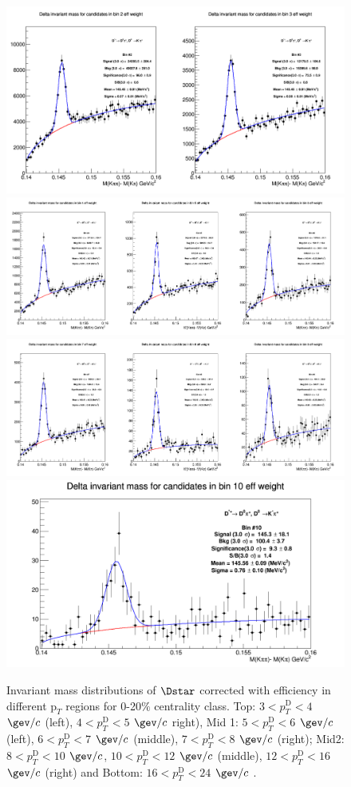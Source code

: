 \begin{figure}[!htp]
\centering
{\includegraphics[width=0.7\linewidth]{figuresVsCent/Dstar/MassPlots/020/InvMassDistributions_Dstar_Bins2to3.png}}
{\includegraphics[width=0.9\linewidth]{figuresVsCent/Dstar/MassPlots/020/InvMassDistributions_Dstar_Bins4to6.png}}
{\includegraphics[width=0.9\linewidth]{figuresVsCent/Dstar/MassPlots/020/InvMassDistributions_Dstar_Bins7to9.png}}
{\includegraphics[width=0.6\linewidth]{figuresVsCent/Dstar/MassPlots/020/InvMassDistributions_Dstar_Bins10to10.png}}
\caption{Invariant mass distributions of $\Dstar$ corrected with efficiency in different $\text{p}_T$ regions for 0-20$\%$ centrality class. Top: $3< p_{T}^{\text{D}}< 4$ $\gev/c$ (left), $4< p_{T}^{\text{D}}< 5$ $\gev/c$ right), Mid 1: $5< p_{T}^{\text{D}}< 6$ $\gev/c$ (left), $6 < p_{T}^{\text{D}} < 7$ $\gev/c$ (middle), $7< p_{T}^{\text{D}}< 8$ $\gev/c$ (right); Mid2: $8< p_{T}^{\text{D}}< 10$ $\gev/c$, $10< p_{T}^{\text{D}}< 12$ $\gev/c$  (middle), $12 < p_{T}^{\text{D}}< 16$ $\gev/c$  (right) and Bottom: $16<p_{T}^{\text{D}}< 24$ $\gev/c$ .}
\label{fig:InvMassDs020}
\end{figure}

